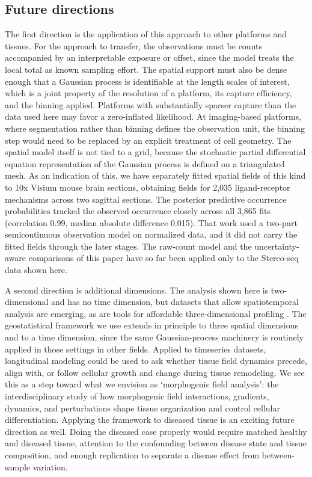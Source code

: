 \documentclass[10pt,letterpaper]{article}
\begin{document}
\subsection*{Future directions}

The first direction is the application of this approach to other platforms and tissues. For the approach to transfer, the observations must be counts accompanied by an interpretable exposure or offset, since the model treats the local total as known sampling effort. The spatial support must also be dense enough that a Gaussian process is identifiable at the length scales of interest, which is a joint property of the resolution of a platform, its capture efficiency, and the binning applied. Platforms with substantially sparser capture than the data used here may favor a zero-inflated likelihood. At imaging-based platforms, where segmentation rather than binning defines the observation unit, the binning step would need to be replaced by an explicit treatment of cell geometry. The spatial model itself is not tied to a grid, because the stochastic partial differential equation representation of the Gaussian process is defined on a triangulated mesh. As an indication of this, we have separately fitted spatial fields of this kind to 10x Visium mouse brain sections, obtaining fields for 2,035 ligand-receptor mechanisms across two sagittal sections. The posterior predictive occurrence probabilities tracked the observed occurrence closely across all 3,865 fits (correlation 0.99, median absolute difference 0.015). That work used a two-part semicontinuous observation model on normalized data, and it did not carry the fitted fields through the later stages. The raw-count model and the uncertainty-aware comparisons of this paper have so far been applied only to the Stereo-seq data shown here.

A second direction is additional dimensions. The analysis shown here is two-dimensional and has no time dimension, but datasets that allow spatiotemporal analysis are emerging, as are tools for affordable three-dimensional profiling \cite{Reynolds2025}. The geostatistical framework we use extends in principle to three spatial dimensions and to a time dimension, since the same Gaussian-process machinery is routinely applied in those settings in other fields. Applied to timeseries datasets, longitudinal modeling could be used to ask whether tissue field dynamics precede, align with, or follow cellular growth and change during tissue remodeling. We see this as a step toward what we envision as `morphogenic field analysis': the interdisciplinary study of how morphogenic field interactions, gradients, dynamics, and perturbations shape tissue organization and control cellular differentiation. Applying the framework to diseased tissue is an exciting future direction as well. Doing the diseased case properly would require matched healthy and diseased tissue, attention to the confounding between disease state and tissue composition, and enough replication to separate a disease effect from between-sample variation.
\end{document}
